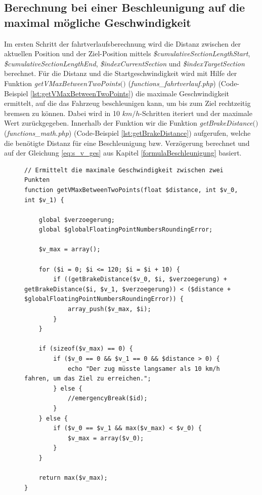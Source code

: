\subsection{Berechnung bei einer Beschleunigung auf die maximal mögliche Geschwindigkeit} \label{v_max}
Im ersten Schritt der \Gls{fahrtverlauf}sberechnung wird die Distanz zwischen der aktuellen Position und der Ziel-Position mittels \textit{\$cumulativeSectionLengthStart}, \textit{\$cumulativeSectionLengthEnd}, \textit{\$indexCurrentSection} und \textit{\$indexTargetSection} berechnet. Für die Distanz und die Startgeschwindigkeit wird mit Hilfe der Funktion \textit{get\-V\-Max\-Be\-tween\-Two\-Points$($$)$} (\textit{func\-tions\_fahrt\-ver\-lauf.php}) (Code-Beispiel \ref{lst:getVMaxBetweenTwoPoints}) die maximale Geschwindigkeit ermittelt, auf die das Fahrzeug beschleunigen kann, um bis zum Ziel rechtzeitig bremsen zu können. Dabei wird in 10 $km/h$-Schritten iteriert und der maximale Wert zurückgegeben. Innerhalb der Funktion wir die Funktion \textit{getBrakeDistance$($$)$} (\textit{functions\_math.php}) (Code-Beispiel \ref{lst:getBrakeDistance}) aufgerufen, welche die benötigte Distanz für eine Beschleunigung bzw. Verzögerung berechnet und auf der Gleichung \ref{eq:s_v_ges} aus Kapitel \ref{formulaBeschleunigung} basiert.
\begin{figure}
\begin{lstlisting}[caption={\textit{getVMaxBetweenTwoPoints$($$)$} (\textit{functions\_fahrtverlauf.php})},captionpos=b,label={lst:getVMaxBetweenTwoPoints}]
// Ermittelt die maximale Geschwindigkeit zwischen zwei Punkten
function getVMaxBetweenTwoPoints(float $distance, int $v_0, int $v_1) {

	global $verzoegerung;
	global $globalFloatingPointNumbersRoundingError;

	$v_max = array();

	for ($i = 0; $i <= 120; $i = $i + 10) {
		if ((getBrakeDistance($v_0, $i, $verzoegerung) + getBrakeDistance($i, $v_1, $verzoegerung)) < ($distance + $globalFloatingPointNumbersRoundingError)) {
			array_push($v_max, $i);
		}
	}

	if (sizeof($v_max) == 0) {
		if ($v_0 == 0 && $v_1 == 0 && $distance > 0) {
			echo "Der zug müsste langsamer als 10 km/h fahren, um das Ziel zu erreichen.";
		} else {
			//emergencyBreak($id);
		}
	} else {
		if ($v_0 == $v_1 && max($v_max) < $v_0) {
			$v_max = array($v_0);
		}
	}

	return max($v_max);
}
\end{lstlisting}
\end{figure}

